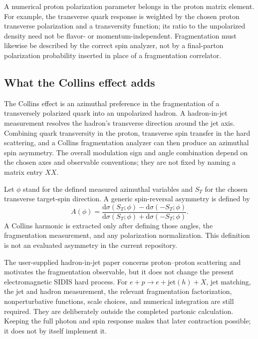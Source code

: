 \documentclass[11pt,a4paper]{article}
\newcommand{\dd}{\mathrm{d}}
\begin{document}
A numerical proton polarization parameter belongs in the proton matrix element. For example, the transverse quark response is weighted by the chosen proton transverse polarization and a transversity function; its ratio to the unpolarized density need not be flavor- or momentum-independent. Fragmentation must likewise be described by the correct spin analyzer, not by a final-parton polarization probability inserted in place of a fragmentation correlator.

\subsection{What the Collins effect adds}
The Collins effect is an azimuthal preference in the fragmentation of a transversely polarized quark into an unpolarized hadron. A hadron-in-jet measurement resolves the hadron's transverse direction around the jet axis. Combining quark transversity in the proton, transverse spin transfer in the hard scattering, and a Collins fragmentation analyzer can then produce an azimuthal spin asymmetry. The overall modulation sign and angle combination depend on the chosen axes and observable conventions; they are not fixed by naming a matrix entry $XX$.

Let $\phi$ stand for the defined measured azimuthal variables and $S_T$ for the chosen transverse target-spin direction. A generic spin-reversal asymmetry is defined by
\begin{equation}
 A(\phi)=\frac{\dd\sigma(S_T;\phi)-\dd\sigma(-S_T;\phi)}
 {\dd\sigma(S_T;\phi)+\dd\sigma(-S_T;\phi)}.
\end{equation}
A Collins harmonic is extracted only after defining those angles, the fragmentation measurement, and any polarization normalization. This definition is not an evaluated asymmetry in the current repository.

The user-supplied hadron-in-jet paper \cite{collinspp} concerns proton--proton scattering and motivates the fragmentation observable, but it does not change the present electromagnetic SIDIS hard process. For $e+p\to e+\mathrm{jet}(h)+X$, jet matching, the jet and hadron measurement, the relevant fragmentation factorization, nonperturbative functions, scale choices, and numerical integration are still required. They are deliberately outside the completed partonic calculation. Keeping the full photon and spin response makes that later contraction possible; it does not by itself implement it.

\appendix
\end{document}
